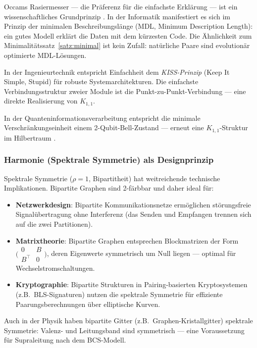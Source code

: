 ﻿\documentclass[a4paper,12pt]{article}
\theoremstyle{definition}
\begin{document}
Occams Rasiermesser --- die Präferenz für die einfachste Erklärung --- ist ein
wissenschaftliches Grundprinzip \cite{kolmogorov1965}. In der Informatik manifestiert
es sich im Prinzip der minimalen Beschreibungslänge (MDL, Minimum Description Length):
ein gutes Modell erklärt die Daten mit dem kürzesten Code.
Die Ähnlichkeit zum Minimalitätssatz~\ref{satz:minimal} ist kein Zufall: natürliche
Paare sind evolutionär optimierte MDL-Lösungen.

In der Ingenieurtechnik entspricht Einfachheit dem \emph{KISS-Prinzip}
(Keep It Simple, Stupid) für robuste Systemarchitekturen.
Die einfachste Verbindungsstruktur zweier Module ist die Punkt-zu-Punkt-Verbindung
--- eine direkte Realisierung von $K_{1,1}$.

In der Quanteninformationsverarbeitung entspricht die minimale Verschränkungseinheit
einem 2-Qubit-Bell-Zustand --- erneut eine $K_{1,1}$-Struktur im Hilbertraum
\cite{dirac1930}.

\subsubsection*{Harmonie (Spektrale Symmetrie) als Designprinzip}

Spektrale Symmetrie ($\rho = 1$, Bipartitheit) hat weitreichende technische
Implikationen. Bipartite Graphen sind 2-färbbar und daher ideal für:
\begin{itemize}
	\item \textbf{Netzwerkdesign}: Bipartite Kommunikationsnetze ermöglichen
	störungsfreie Signalübertragung ohne Interferenz (das Senden und Empfangen
	trennen sich auf die zwei Partitionen).
	\item \textbf{Matrixtheorie}: Bipartite Graphen entsprechen Blockmatrizen der Form
	$\bigl(\begin{smallmatrix}0 & B \\ B^\top & 0\end{smallmatrix}\bigr)$,
	deren Eigenwerte symmetrisch um Null liegen --- optimal für
	Wechselstromschaltungen.
	\item \textbf{Kryptographie}: Bipartite Strukturen in Pairing-basierten
	Kryptosystemen (z.B.\ BLS-Signaturen) nutzen die spektrale Symmetrie für
	effiziente Paarungsberechnungen über elliptische Kurven.
\end{itemize}

Auch in der Physik haben bipartite Gitter (z.B.\ Graphen-Kristallgitter) spektrale
Symmetrie: Valenz- und Leitungsband sind symmetrisch --- eine Voraussetzung für
Supraleitung nach dem BCS-Modell.
\end{document}
